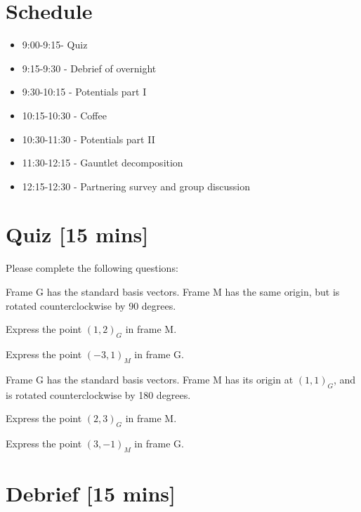 \documentclass{tufte-handout}
\begin{document}
\maketitle
\thispagestyle{firstpage}

\section*{Schedule}
\begin{itemize}
\item 9:00-9:15- Quiz
\item 9:15-9:30 - Debrief of overnight
\item 9:30-10:15 - Potentials part I
\item 10:15-10:30 - Coffee
\item 10:30-11:30 - Potentials part II
\item 11:30-12:15 - Gauntlet decomposition
\item 12:15-12:30 - Partnering survey and group discussion
\end{itemize}


\section{Quiz [15 mins]}

Please complete the following questions:

\be
\item Frame G has the standard basis vectors. Frame M has the same origin, but is rotated counterclockwise by 90 degrees.
\be
\item Express the point $(1,2)_G$ in frame M.
\item Express the point $(-3,1)_M$ in frame G.
\ee
\item Frame G has the standard basis vectors. Frame M has its origin at $(1,1)_G$, and is rotated counterclockwise by 180 degrees.
\be
\item Express the point $(2,3)_G$ in frame M.
\item Express the point $(3,-1)_M$ in frame G.
\ee
\ee

\section{Debrief [15 mins]}
\end{document}
